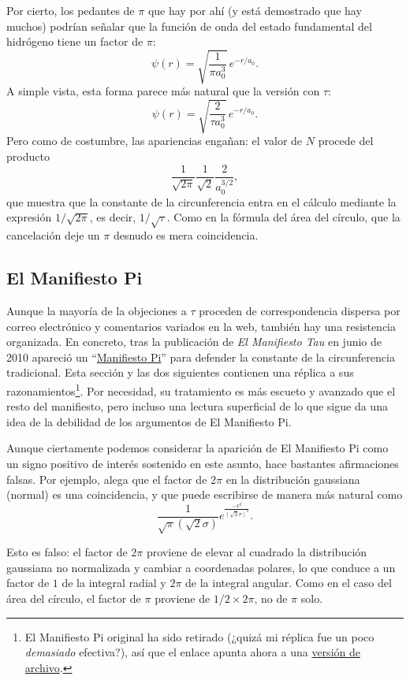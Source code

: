 Por cierto, los pedantes de $\pi$ que hay por ahí (y está demostrado que hay muchos) podrían señalar que la función de onda del estado fundamental del hidrógeno tiene un factor de $\pi$:
\[
\psi(r) = \sqrt{\frac{1}{\pi a_0^3}}\,e^{-r/a_0}.
\]
A simple vista, esta forma parece más natural que la versión con $\tau$:
\[
\psi(r) = \sqrt{\frac{2}{\tau a_0^3}}\,e^{-r/a_0}.
\]
Pero como de costumbre, las apariencias engañan: el valor de $N$ procede del producto
\[
\frac{1}{\sqrt{2\pi}} \frac{1}{\sqrt{2}} \frac{2}{a_0^{3/2}},
\]
que muestra que la constante de la circunferencia entra en el cálculo mediante la expresión $1/\sqrt{2\pi}$, es decir, $1/\sqrt{\tau}$. Como en la fórmula del área del círculo, que la cancelación deje un $\pi$ desnudo es mera coincidencia.



  \subsection{El Manifiesto Pi} %
  \label{sec:the_pi_manifesto_a_rebuttal}

Aunque la mayoría de la objeciones a $\tau$ proceden de correspondencia dispersa por correo electrónico y comentarios variados en la web, también hay una resistencia organizada. En concreto, tras la publicación de \emph{El Manifiesto Tau} en junio de 2010 apareció un ``\href{https://archive.md/VnJ2x}{Manifiesto Pi}'' para defender la constante de la circunferencia tradicional. Esta sección y las dos siguientes contienen una réplica a sus razonamientos\footnote{El Manifiesto Pi original ha sido retirado (¿quizá mi réplica fue un poco \emph{demasiado} efectiva?), así que el enlace apunta ahora a una \href{https://archive.md/VnJ2x}{versión de archivo}.}. Por necesidad, su tratamiento es más escueto y avanzado que el resto del manifiesto, pero incluso una lectura superficial de lo que sigue da una idea de la debilidad de los argumentos de El Manifiesto Pi.

Aunque ciertamente podemos considerar la aparición de El Manifiesto Pi como un signo positivo de interés sostenido en este asunto, hace bastantes afirmaciones falsas. Por ejemplo, alega que el factor de $2\pi$ en la distribución gaussiana (normal) es una coincidencia, y que puede escribirse de manera más natural como
\[
\frac{1}{\sqrt\pi(\sqrt 2\sigma)}e^{\frac{-x^2}{(\sqrt 2\sigma)^2}}.
\]

Esto es falso: el factor de $2\pi$ proviene de elevar al cuadrado la distribución gaussiana no normalizada y cambiar a coordenadas polares, lo que conduce a un factor de $1$ de la integral radial y  $2\pi$ de la integral angular. Como en el caso del área del círculo, el factor de $\pi$ proviene de $1/2\times 2\pi$, no de $\pi$ solo.

